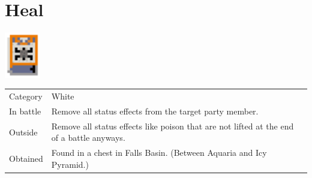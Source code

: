 \section{Heal}
\label{spell:heal}

\includegraphics[height=2cm,keepaspectratio]{./resources/spells/heal}

\begin{longtable}{ l p{9cm} }
	Category
	& White
\\ %
	In battle
	& Remove all status effects from the target party member.
\\ %
	Outside
	& Remove all status effects like poison that are not lifted at the end of a battle anyways.
\\ %
	Obtained
	& Found in a chest in Falls Basin. (Between Aquaria and Icy Pyramid.)
\end{longtable}
